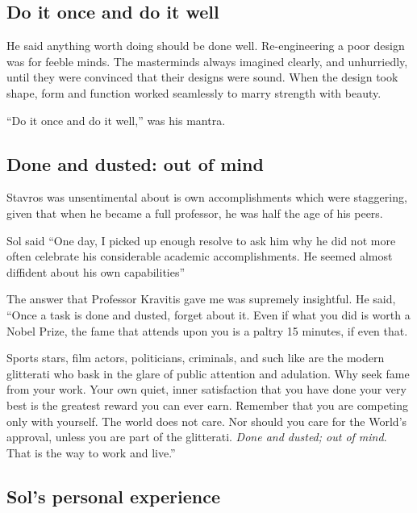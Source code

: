 \documentclass[
  a4paper,
]{article}
\begin{document}
\hypertarget{do-it-once-and-do-it-well}{%
\subsection{Do it once and do it well}\label{do-it-once-and-do-it-well}}

He said anything worth doing should be done well. Re-engineering a poor
design was for feeble minds. The masterminds always imagined clearly,
and unhurriedly, until they were convinced that their designs were
sound. When the design took shape, form and function worked seamlessly
to marry strength with beauty.

``Do it once and do it well,'' was his mantra.

\hypertarget{done-and-dusted-out-of-mind}{%
\subsection{Done and dusted: out of
mind}\label{done-and-dusted-out-of-mind}}

Stavros was unsentimental about is own accomplishments which were
staggering, given that when he became a full professor, he was half the
age of his peers.

Sol said ``One day, I picked up enough resolve to ask him why he did not
more often celebrate his considerable academic accomplishments. He
seemed almost diffident about his own capabilities''

The answer that Professor Kravitis gave me was supremely insightful. He
said, ``Once a task is done and dusted, forget about it. Even if what
you did is worth a Nobel Prize, the fame that attends upon you is a
paltry 15 minutes, if even that.

Sports stars, film actors, politicians, criminals, and such like are the
modern glitterati who bask in the glare of public attention and
adulation. Why seek fame from your work. Your own quiet, inner
satisfaction that you have done your very best is the greatest reward
you can ever earn. Remember that you are competing only with yourself.
The world does not care. Nor should you care for the World's approval,
unless you are part of the glitterati. \emph{Done and dusted; out of
mind}. That is the way to work and live.''

\hypertarget{sols-personal-experience}{%
\subsection{Sol's personal experience}\label{sols-personal-experience}}
\end{document}
